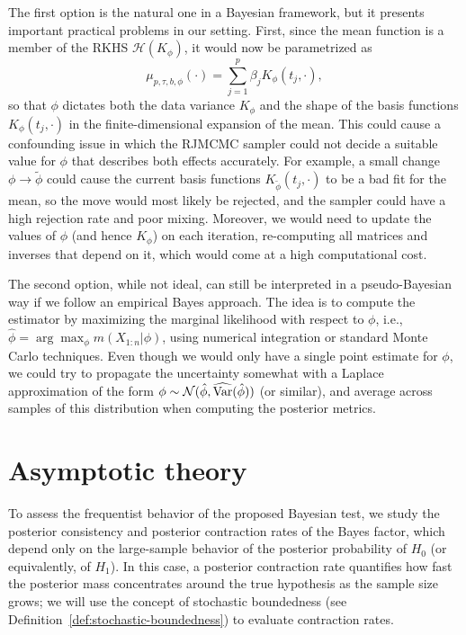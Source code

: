 The first option is the natural one in a Bayesian framework, but it presents important practical problems in our setting. First, since the mean function is a member of the \acs{RKHS} \(\mathcal H(K_\phi)\), it would now be parametrized as
\[
\mu_{p, \tau, b, \phi}(\cdot) = \sum_{j=1}^p \beta_j K_\phi(t_j, \cdot),
\]
so that \(\phi\) dictates both the data variance \(K_\phi\) and the shape of the basis functions \(K_\phi(t_j, \cdot)\) in the finite-dimensional expansion of the mean. This could cause a confounding issue in which the \acs{RJMCMC} sampler could not decide a suitable value for \(\phi\) that describes both effects accurately. For example, a small change \(\phi\to\tilde\phi\) could cause the current basis functions \(K_{\tilde\phi}(t_j, \cdot)\) to be a bad fit for the mean, so the move would most likely be rejected, and the sampler could have a high rejection rate and poor mixing. Moreover, we would need to update the values of \(\phi\) (and hence \(K_\phi\)) on each iteration, re-computing all matrices and inverses that depend on it, which would come at a high computational cost.

The second option, while not ideal, can still be interpreted in a pseudo-Bayesian way if we follow an empirical Bayes approach. The idea is to compute the estimator by maximizing the marginal likelihood with respect to \(\phi\), i.e., \(\hat\phi = \arg\max_\phi m(X_{1:n}|\phi)\), using numerical integration or standard Monte Carlo techniques. Even though we would only have a single point estimate for \(\phi\), we could try to propagate the uncertainty somewhat with a Laplace approximation of the form \(\phi \sim \mathcal N(\hat\phi, \widehat{{\operatorname{Var}}}(\hat\phi))\) (or similar), and average across samples of this distribution when computing the posterior metrics.


\section{Asymptotic theory}\label{sec:consistency-bft}

To assess the frequentist behavior of the proposed Bayesian test, we study the posterior consistency and posterior contraction rates of the Bayes factor, which depend only on the large-sample behavior of the posterior probability of \(H_0\) (or equivalently, of \(H_1\)). In this case, a posterior contraction rate quantifies how fast the posterior mass concentrates around the true hypothesis as the sample size grows; we will use the concept of stochastic boundedness (see Definition~\ref{def:stochastic-boundedness}) to evaluate contraction rates. 

